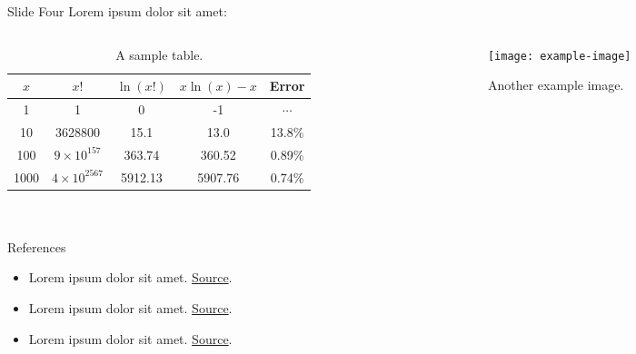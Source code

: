 \documentclass[aspectratio=169]{beamer}  %
\begin{document}

\begin{frame}{Slide Four}
 Lorem ipsum dolor sit amet:
    \begin{columns}
        \begin{column}{0.5\textwidth}
           \begin{framefont}{\footnotesize}
               \begin{table}
                   \centering
                   \begin{tabular}{|c|c|c|c|c|} 
                       \hline
                       $x$ & $x!$ & $\ln(x!)$ & $x\ln(x) - x$ & Error \\ \hline
                       1 & 1 & 0 & -1 & $\cdots$ \\ \hline
                       10 & 3628800 & 15.1 & 13.0 & 13.8\% \\ \hline
                       100 & $9\times 10^{157}$ & 363.74 & 360.52 & 0.89\% \\ \hline
                       1000 & $4\times 10^{2567}$ & 5912.13 & 5907.76 & 0.74\% \\ \hline 
                   \end{tabular} 
                   \caption{A sample table.}
                   \label{tab:table}
               \end{table}
            \end{framefont}
        \end{column}
        \begin{column}{0.4\textwidth}  
            \begin{figure}
                \centering
                \texttt{[image: example-image]}
                \caption{Another example image.}
            \end{figure}
        \end{column}
    \end{columns}
\end{frame}


\bulletoff\section*{}
\begin{frame}{References}
\begin{itemize}
    \item Lorem ipsum dolor sit amet. \href{<>}{Source}. 
    \item Lorem ipsum dolor sit amet. \href{<>}{Source}. 
    \item Lorem ipsum dolor sit amet. \href{<>}{Source}. 
\end{itemize}
\end{frame}
\end{document}
